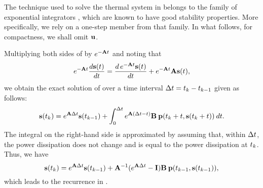 The technique used to solve the thermal system in  belongs to the family of exponential integrators \cite{hochbruck2010}, which are known to have good stability properties.
More specifically, we rely on a one-step member from that family.
In what follows, for compactness, we shall omit $\mathbf{u}$.

Multiplying both sides of  by $e^{- \mathbf{A} t}$ and noting that
\[
  e^{-\mathbf{A} t} \frac{d\mathbf{s}(t)}{dt} = \frac{d\, e^{-\mathbf{A} t} \mathbf{s}(t)}{dt} + e^{-\mathbf{A} t} \mathbf{A} \mathbf{s}(t),
\]
we obtain the exact solution of  over a time interval $\Delta t = t_k - t_{k - 1}$ given as follows:
\[
  \mathbf{s}(t_k) = e^{\mathbf{A} \Delta t} \mathbf{s}(t_{k - 1}) + \int_0^{\Delta t} e^{\mathbf{A} (\Delta t - t)} \mathbf{B} \: \mathbf{p}(t_k + t, \mathbf{s}(t_k + t)) \: dt.
\]
The integral on the right-hand side is approximated by assuming that, within $\Delta t$, the power dissipation does not change and is equal to the power dissipation at $t_k$.
Thus, we have
\[
  \mathbf{s}(t_k) = e^{\mathbf{A} \Delta t} \mathbf{s}(t_{k - 1}) + \mathbf{A}^{-1}(e^{\mathbf{A} \Delta t} - \mathbf{I}) \mathbf{B} \: \mathbf{p}(t_{k - 1}, \mathbf{s}(t_{k - 1})),
\]
which leads to the recurrence in .
